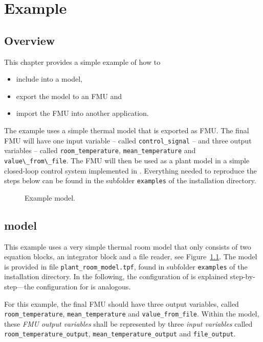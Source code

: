 \chapter{Example}

\section{Overview}

This chapter provides a simple example of how to
\begin{itemize}
  \item include \type into a \trnsys model,
  \item export the model to an FMU and
  \item import the FMU into another application.
\end{itemize}

The example uses a simple thermal model that is exported as FMU.
The final FMU will have one input variable -- called \verb!control_signal! -- and three output variables -- called \verb!room_temperature!, \verb!mean_temperature! and \verb!value\_from\_file!.
The FMU will then be used as a plant model in a simple closed-loop control system implemented in \href{https://en.wikipedia.org/wiki/Dymola}{\dymola}.
Everything needed to reproduce the steps below can be found in the subfolder \texttt{examples} of the installation directory.

\begin{figure}[h!]
\caption{Example \trnsys model.}
\label{fig:trnsys_model_example}
\end{figure}


\section{\trnsys model}

This example uses a very simple thermal room model that only consists of two equation blocks, an integrator block and a file reader, see Figure~\ref{fig:trnsys_model_example}.
The model is provided in file \verb!plant_room_model.tpf!, found in subfolder \verb!examples! of the installation directory.
In the following, the configuration of \typeb is explained step-by-step---the configuration for \typea is analogous.

For this example, the final FMU should have three output variables, called \texttt{room\_temperature}, \texttt{mean\_temperature} and \texttt{value\_from\_file}.
Within the \trnsys model, these \emph{FMU output variables} shall be represented by three \emph{\typeb input variables} called \texttt{room\_temperature\_output}, \texttt{mean\_temperature\_output} and \texttt{file\_output}.


